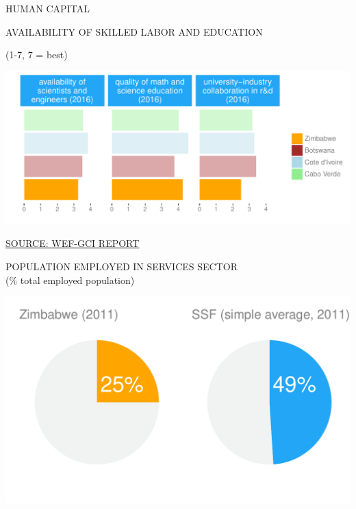 \documentclass{article}\usepackage[]{graphicx}\usepackage[]{color}
\makeatletter
\def\maxwidth{ %
  \ifdim\Gin@nat@width>\linewidth
    \linewidth
  \else
    \Gin@nat@width
  \fi
}
\makeatother
\begin{document}

\begin{minipage}[b]{0.95\textwidth}
   \vspace{5ex}
   \begin{flushleft}  
     \hspace{4ex}\Large{\textcolor[HTML]{22A6F5}{HUMAN CAPITAL}}
   \end{flushleft} 
  \begin{minipage}[c]{0.55\textwidth} %
    \hspace{4ex}\small{\textcolor[HTML]{818181}{AVAILABILITY OF SKILLED LABOR AND EDUCATION}} 
    
    \hspace{4ex}\footnotesize{\textcolor[HTML]{818181}{(1-7, 7 = best)}}


\hfill{}\includegraphics[width=\maxwidth]{figure/bar_facewrap_chart_Human-1} 



    \hspace{4ex}\scriptsize{\href{http://www3.weforum.org/docs/gcr/2015-2016/GCI_Dataset_2006-2015.xlsx}{\textcolor[HTML]{22A6F5}{SOURCE: WEF-GCI REPORT}}}
  \end{minipage}
  \begin{minipage}[c]{0.43\textwidth} %
    \small{\textcolor[HTML]{818181}{POPULATION EMPLOYED IN SERVICES SECTOR \\ \footnotesize(\% total employed population)}}
    \vspace{-2ex}


{\centering \includegraphics[width=\maxwidth]{figure/pie_chart_double_Human-1} 

}
\end{minipage}
\end{minipage}
\end{document}
